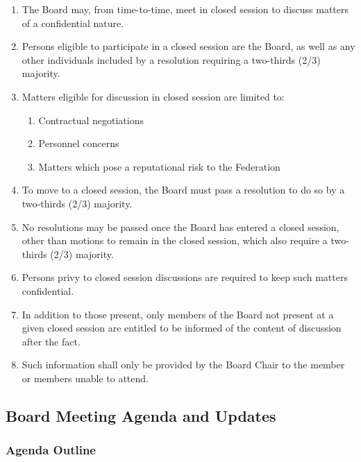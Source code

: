 \begin{enumerate}
 \item
  The Board may, from time-to-time, meet in closed session to discuss matters of a confidential nature.
 \item
  Persons eligible to participate in a closed session are the Board, as well as any other individuals included by a resolution requiring a two-thirds (2/3) majority.
 \item
  Matters eligible for discussion in closed session are limited to:

  \begin{enumerate}
   \item
    Contractual negotiations
   \item
    Personnel concerns
   \item
    Matters which pose a reputational risk to the Federation
  \end{enumerate}

 \item
  To move to a closed session, the Board must pass a resolution to do so by a two-thirds (2/3) majority.
 \item
  No resolutions may be passed once the Board has entered a closed session, other than motions to remain in the closed session, which also require a two-thirds (2/3) majority.
 \item
  Persons privy to closed session discussions are required to keep such matters confidential.
 \item
  In addition to those present, only members of the Board not present at a given closed session are entitled to be informed of the content of discussion after the fact.
 \item
  Such information shall only be provided by the Board Chair to the member or members unable to attend.
\end{enumerate}

\subsection{Board Meeting Agenda and Updates}
\label{board-meeting-agenda-and-updates}

\subsubsection{Agenda Outline}
\label{agenda-outline}


